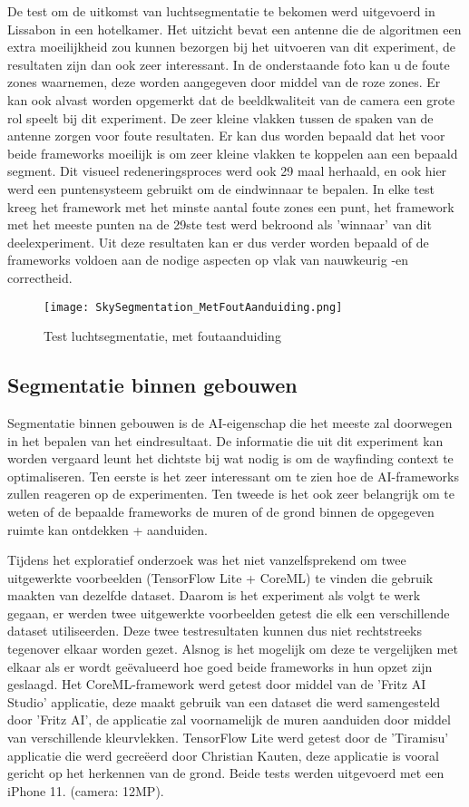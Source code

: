 De test om de uitkomst van luchtsegmentatie te bekomen werd uitgevoerd in Lissabon in een hotelkamer. Het uitzicht bevat een antenne die de algoritmen een extra moeilijkheid zou kunnen bezorgen bij het uitvoeren van dit experiment, de resultaten zijn dan ook zeer interessant. In de onderstaande foto kan u de foute zones waarnemen, deze worden  aangegeven door middel van de roze zones. Er kan ook alvast worden opgemerkt dat de beeldkwaliteit van de camera een grote rol speelt bij dit experiment. De zeer kleine vlakken tussen de spaken van de antenne zorgen voor foute resultaten. Er kan dus worden bepaald dat het voor beide frameworks moeilijk is om zeer kleine vlakken te koppelen aan een bepaald segment. Dit visueel redeneringsproces werd ook 29 maal herhaald, en ook hier werd een puntensysteem gebruikt om de eindwinnaar te bepalen. In elke test kreeg het framework met het minste aantal foute zones een punt, het framework met het meeste punten na de 29ste test werd bekroond als 'winnaar' van dit deelexperiment. Uit deze resultaten kan er dus verder worden bepaald of de frameworks voldoen aan de nodige aspecten op vlak van nauwkeurig -en correctheid.
\begin{figure}[H]
	\centering
	\texttt{[image: SkySegmentation\_MetFoutAanduiding.png]}
	\caption{Test luchtsegmentatie, met foutaanduiding}
\end{figure}


\subsection{Segmentatie binnen gebouwen}
Segmentatie binnen gebouwen is de AI-eigenschap die het meeste zal doorwegen in het bepalen van het eindresultaat. De informatie die uit dit experiment kan worden vergaard leunt het dichtste bij wat nodig is om de wayfinding context te optimaliseren. Ten eerste is het zeer interessant om te zien hoe de AI-frameworks zullen reageren op de experimenten. Ten tweede is het ook zeer belangrijk om te weten of de bepaalde frameworks de muren of de grond binnen de opgegeven ruimte kan ontdekken + aanduiden. 

Tijdens het exploratief onderzoek was het niet vanzelfsprekend om twee uitgewerkte voorbeelden (TensorFlow Lite + CoreML) te vinden die gebruik maakten van dezelfde dataset. Daarom is het experiment als volgt te werk gegaan, er werden twee uitgewerkte voorbeelden getest die elk een verschillende dataset utiliseerden. Deze twee testresultaten kunnen dus niet rechtstreeks tegenover elkaar worden gezet. Alsnog is het mogelijk om deze te vergelijken met elkaar als er wordt geëvalueerd hoe goed beide frameworks in hun opzet zijn geslaagd. Het CoreML-framework werd getest door middel van de 'Fritz AI Studio' applicatie, deze maakt gebruik van een dataset die werd samengesteld door 'Fritz AI', de applicatie zal voornamelijk de muren aanduiden door middel van verschillende kleurvlekken. TensorFlow Lite werd getest door de 'Tiramisu' applicatie die werd gecreëerd door Christian Kauten, deze applicatie is vooral gericht op het herkennen van de grond. Beide tests werden uitgevoerd met een iPhone 11. (camera: 12MP).


